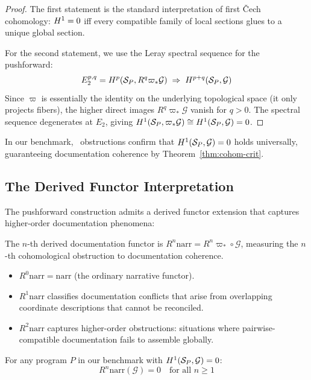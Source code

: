\documentclass[11pt]{article}
\newcommand{\NarrFunc}{\mathrm{narr}}
\newcommand{\ProjFunc}{\varpi}                        %
\begin{document}
\begin{proof}
The first statement is the standard interpretation of first \v{C}ech
cohomology: $H^{1} = 0$ iff every compatible family of local
sections glues to a unique global section.

For the second statement, we use the Leray spectral sequence for the
pushforward:
\[
  E_2^{p,q} = \Hcoh{p}(\Site_P, R^q \ProjFunc_{*}\mathcal{G})
  \;\Rightarrow\; \Hcoh{p+q}(\Site_P, \mathcal{G})
\]
Since $\ProjFunc$ is essentially the identity on the underlying
topological space (it only projects fibers), the higher direct images
$R^q \ProjFunc_{*}\mathcal{G}$ vanish for $q > 0$.  The spectral
sequence degenerates at $E_2$, giving
$\Hcoh{1}(\Site_P, \ProjFunc_{*}\mathcal{G}) \cong
\Hcoh{1}(\Site_P, \mathcal{G}) = 0$.
\end{proof}

In our benchmark, \compObstructionTotal\ obstructions confirm that
$H^{1}(\mathcal{S}_P, \mathcal{G}) = 0$ holds universally, guaranteeing
documentation coherence by Theorem~\ref{thm:cohom-crit}.

\subsection{The Derived Functor Interpretation}

The pushforward construction admits a derived functor extension that
captures higher-order documentation phenomena:

\begin{definition}\label{def:derived-doc}
The $n$-th derived documentation functor is
$R^n\NarrFunc = R^n\ProjFunc_{*} \circ \mathcal{G}$, measuring the
$n$-th cohomological obstruction to documentation coherence.
\begin{itemize}[noitemsep]
\item $R^0\NarrFunc = \NarrFunc$ (the ordinary narrative functor).
\item $R^1\NarrFunc$ classifies documentation conflicts that arise from
  overlapping coordinate descriptions that cannot be reconciled.
\item $R^2\NarrFunc$ captures higher-order obstructions: situations
  where pairwise-compatible documentation fails to assemble globally.
\end{itemize}
\end{definition}

\begin{proposition}\label{prop:derived-vanish}
For any program $P$ in our benchmark with
$H^{1}(\mathcal{S}_P, \mathcal{G}) = 0$:
\[
  R^n\NarrFunc(\mathcal{G}) = 0 \quad \text{for all } n \geq 1
\]
\end{proposition}
\end{document}
